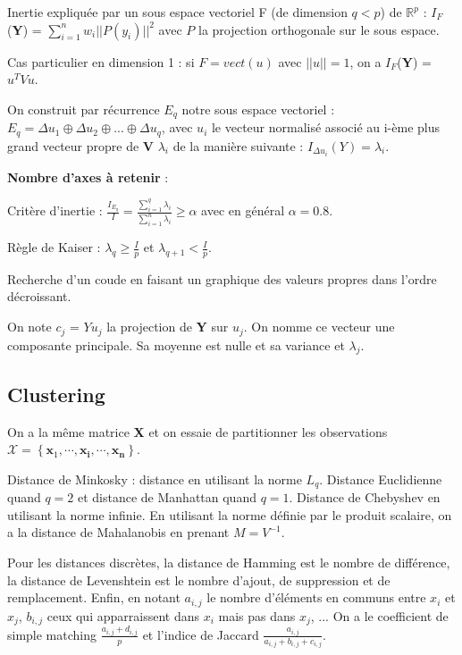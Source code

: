 \documentclass[5pt,a4paper]{article}
\begin{document}
Inertie expliquée par un sous espace vectoriel F (de dimension $q<p$) de $\mathbb{R}^p$ : $I_F$(\textbf{Y}) = $\sum_{i=1}^n w_i ||P(y_i)||^2$ avec $P$ la projection orthogonale sur le sous espace. 

Cas particulier en dimension 1 : si $F=vect(u)$ avec $||u||=1$, on a $I_F$(\textbf{Y}) = $u^TVu$.

On construit par récurrence $E_q$ notre sous espace vectoriel : $E_q = \Delta u_1 \oplus \Delta u_2 \oplus ... \oplus \Delta u_q$, avec $u_i$ le vecteur normalisé associé au i-ème plus grand vecteur propre de \textbf{V} $\lambda _i$ de la manière suivante : $I_{\Delta u_i}(Y) = \lambda _i$.

\textbf{Nombre d'axes à retenir} : 

Critère d'inertie : $\frac{I_{E_q}}{I} = \frac{\sum_{i=1}^q \lambda _i}{\sum_{i=1}^n \lambda _i} \ge \alpha$ avec en général $\alpha = 0.8$.

Règle de Kaiser : $\lambda _q \ge \frac{I}{p}$ et $\lambda _{q+1} < \frac{I}{p}$.

Recherche d'un coude en faisant un graphique des valeurs propres dans l'ordre décroissant.

On note $c_j$ = $Yu_j$ la projection de \textbf{Y} sur $u_j$. On nomme ce vecteur une composante principale. Sa moyenne est nulle et sa variance et $\lambda _j$.

\subsection*{Clustering}

On a la même matrice \textbf{X} et on essaie de partitionner les observations $\mathcal{X}=\left\{\mathbf{x}_{1}, \cdots, \mathbf{x}_{\mathbf{i}}, \cdots, \mathbf{x}_{\mathbf{n}}\right\}$.

Distance de Minkosky : distance en utilisant la norme $L_q$. Distance Euclidienne quand $q=2$ et distance de Manhattan quand $q=1$. Distance de Chebyshev en utilisant la norme infinie. En utilisant la norme définie par le produit scalaire, on a la distance de Mahalanobis en prenant $M=V^{-1}$.

Pour les distances discrètes, la distance de Hamming est le nombre de différence, la distance de Levenshtein est le nombre d'ajout, de suppression et de remplacement. Enfin, en notant $a_{i,j}$ le nombre d'éléments en communs entre $x_i$ et $x_j$, $b_{i,j}$ ceux qui apparraissent dans $x_i$ mais pas dans $x_j$, ... On a le coefficient de simple matching $\frac{a_{i,j}+d_{i,j}}{p}$ et l'indice de Jaccard $\frac{a_{i,j}}{a_{i,j}+b_{i,j}+c_{i,j}}$.
\end{document}
